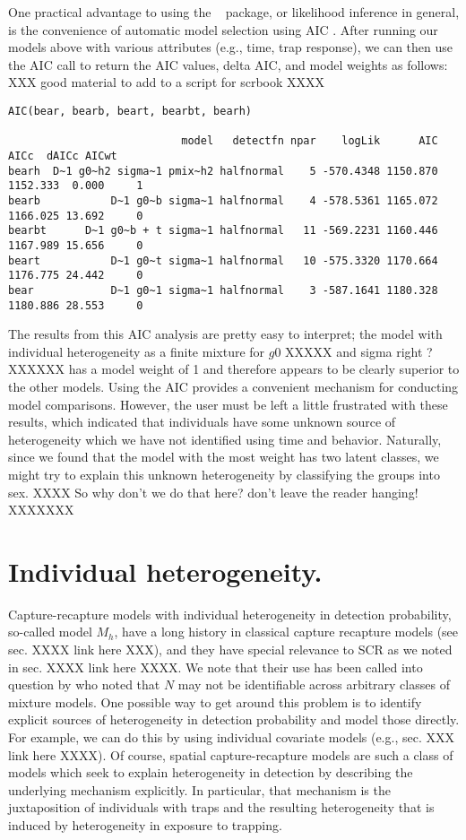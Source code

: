 One practical advantage to using the \secr~ package, or likelihood
inference in general, is the convenience of automatic model selection
using AIC \citep{burnham_anderson:xxxxx}.
After running our models above with various attributes (e.g., time,
trap response), we can then use the AIC call to return the AIC values,
delta AIC, and model weights as follows: XXX good material to add to a
script for scrbook XXXX
{\small
\begin{verbatim}
AIC(bear, bearb, beart, bearbt, bearh)

                           model   detectfn npar    logLik      AIC     AICc  dAICc AICwt
bearh  D~1 g0~h2 sigma~1 pmix~h2 halfnormal    5 -570.4348 1150.870 1152.333  0.000     1
bearb           D~1 g0~b sigma~1 halfnormal    4 -578.5361 1165.072 1166.025 13.692     0
bearbt      D~1 g0~b + t sigma~1 halfnormal   11 -569.2231 1160.446 1167.989 15.656     0
beart           D~1 g0~t sigma~1 halfnormal   10 -575.3320 1170.664 1176.775 24.442     0
bear            D~1 g0~1 sigma~1 halfnormal    3 -587.1641 1180.328 1180.886 28.553     0
\end{verbatim}
}
The results from this AIC analysis are pretty easy to interpret; the model
with individual heterogeneity as a finite mixture for $g0$ XXXXX and
sigma right ?XXXXXX
 has a
model weight of 1 and therefore appears to be clearly superior to the
other models.  Using the AIC provides a convenient mechanism for
conducting model comparisons.  However, the user must be left a little
frustrated with these results, which indicated that individuals have
some unknown source of heterogeneity which we have not identified
using time and behavior.  Naturally, since we found that the model
with the most weight has two latent classes, we might try to explain
this unknown heterogeneity by classifying the groups into sex.
XXXX So why don't we do that here? don't leave the reader hanging! XXXXXXX




\section{Individual heterogeneity.}

Capture-recapture models with individual heterogeneity in detection
probability, so-called model $M_{h}$, have a long history in classical
capture recapture models (see sec. XXXX link here XXX), and they have
special relevance to SCR as we noted in sec. XXXX link here XXXX.  We
note that their use has been called into question by \citet{link:2003}
who noted that $N$ may not be identifiable across arbitrary classes of
mixture models.  One possible way to get around this problem is to
identify explicit sources of heterogeneity in detection probability
and model those directly. For example, we can do this by using
individual covariate models (e.g., sec. XXX link here XXXX). Of
course, spatial capture-recapture models are such a class of models
which seek to explain heterogeneity in detection by describing the
underlying mechanism explicitly. In particular, that mechanism is the
juxtaposition of individuals with traps and the resulting
heterogeneity that is induced by heterogeneity in exposure to
trapping.



